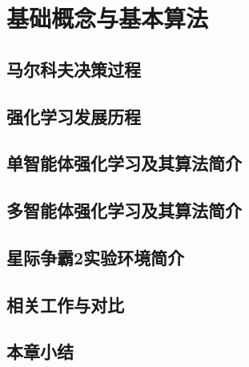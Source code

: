
\chapter{基础概念与基本算法}
\section{马尔科夫决策过程}

\section{强化学习发展历程}

\section{单智能体强化学习及其算法简介}

\section{多智能体强化学习及其算法简介}

\section{星际争霸2实验环境简介}

\section{相关工作与对比}

\section{本章小结}

